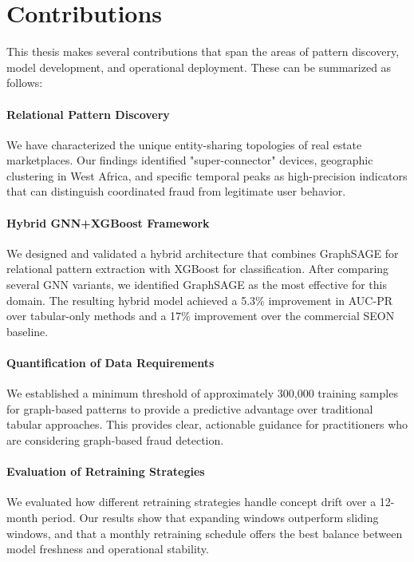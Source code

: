 \section{Contributions}
\label{sec:6_2}

This thesis makes several contributions that span the areas of pattern discovery, model development, and operational deployment. These can be summarized as follows:

\paragraph{Relational Pattern Discovery}
We have characterized the unique entity-sharing topologies of real estate marketplaces. Our findings identified "super-connector" devices, geographic clustering in West Africa, and specific temporal peaks as high-precision indicators that can distinguish coordinated fraud from legitimate user behavior.

\paragraph{Hybrid GNN+XGBoost Framework}
We designed and validated a hybrid architecture that combines GraphSAGE for relational pattern extraction with XGBoost for classification. After comparing several GNN variants, we identified GraphSAGE as the most effective for this domain. The resulting hybrid model achieved a 5.3\% improvement in AUC-PR over tabular-only methods and a 17\% improvement over the commercial SEON baseline.

\paragraph{Quantification of Data Requirements}
We established a minimum threshold of approximately 300,000 training samples for graph-based patterns to provide a predictive advantage over traditional tabular approaches. This provides clear, actionable guidance for practitioners who are considering graph-based fraud detection.

\paragraph{Evaluation of Retraining Strategies}
We evaluated how different retraining strategies handle concept drift over a 12-month period. Our results show that expanding windows outperform sliding windows, and that a monthly retraining schedule offers the best balance between model freshness and operational stability.

